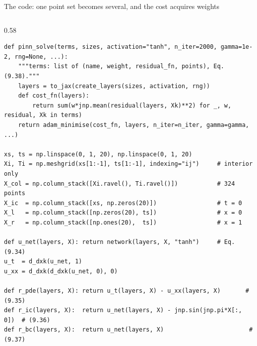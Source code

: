 \documentclass[10pt,aspectratio=169]{beamer}
\begin{document}
\begin{frame}[fragile]{The code: one point set becomes several, and the cost acquires weights}
\vspace{-3pt}
\begin{columns}[T]
\begin{column}{0.58\textwidth}
\lstset{basicstyle=\ttfamily\tiny}
\begin{lstlisting}
def pinn_solve(terms, sizes, activation="tanh", n_iter=2000, gamma=1e-2, rng=None, ...):
    """terms: list of (name, weight, residual_fn, points), Eq. (9.38)."""
    layers = to_jax(create_layers(sizes, activation, rng))
    def cost_fn(layers):
        return sum(w*jnp.mean(residual(layers, Xk)**2) for _, w, residual, Xk in terms)
    return adam_minimise(cost_fn, layers, n_iter=n_iter, gamma=gamma, ...)

xs, ts = np.linspace(0, 1, 20), np.linspace(0, 1, 20)
Xi, Ti = np.meshgrid(xs[1:-1], ts[1:-1], indexing="ij")     # interior only
X_col = np.column_stack([Xi.ravel(), Ti.ravel()])           # 324 points
X_ic  = np.column_stack([xs, np.zeros(20)])                 # t = 0
X_l   = np.column_stack([np.zeros(20), ts])                 # x = 0
X_r   = np.column_stack([np.ones(20),  ts])                 # x = 1

def u_net(layers, X): return network(layers, X, "tanh")     # Eq. (9.34)
u_t  = d_dxk(u_net, 1)
u_xx = d_dxk(d_dxk(u_net, 0), 0)

def r_pde(layers, X): return u_t(layers, X) - u_xx(layers, X)       # (9.35)
def r_ic(layers, X):  return u_net(layers, X) - jnp.sin(jnp.pi*X[:, 0])  # (9.36)
def r_bc(layers, X):  return u_net(layers, X)                        # (9.37)


\end{lstlisting}
\end{column}
\end{columns}
\end{frame}
\end{document}
